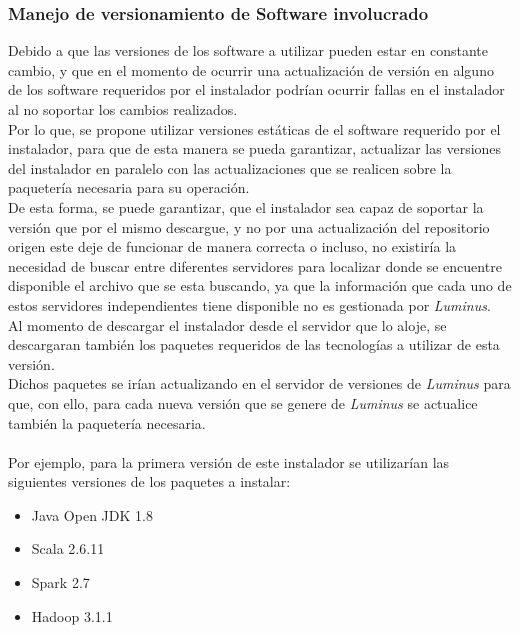 \subsubsection{Manejo de versionamiento de Software involucrado}
Debido a que las versiones de los software a utilizar pueden estar en constante cambio, y que en el momento de ocurrir una actualización de versión en alguno de los software requeridos por el instalador podrían ocurrir fallas en el instalador al no soportar los cambios realizados.
\\
Por lo que, se propone utilizar versiones estáticas de el software requerido por el instalador, para que de esta manera se pueda garantizar, actualizar las versiones del instalador en paralelo con las actualizaciones que se realicen sobre la paquetería necesaria para su operación.
\\
De esta forma, se puede garantizar, que el instalador sea capaz de soportar la versión que por el mismo descargue, y no por una actualización del repositorio origen este deje de funcionar de manera correcta o incluso, no existiría la necesidad de buscar entre diferentes servidores para localizar donde se encuentre disponible el archivo que se esta buscando, ya que la información que cada uno de estos servidores independientes tiene disponible no es gestionada por \emph{Luminus}.
\\
Al momento de descargar el instalador desde el servidor que lo aloje, se descargaran también los paquetes requeridos de las tecnologías a utilizar de esta versión.
\\
Dichos paquetes se irían actualizando en el servidor de versiones de \emph{Luminus} para que, con ello, para cada nueva versión que se genere de \emph{Luminus} se actualice también la paquetería necesaria.
\\
\\
Por ejemplo, para la primera versión de este instalador se utilizarían las siguientes versiones de los paquetes a instalar:
\begin{itemize}
	\item Java Open JDK 1.8
	\item Scala 2.6.11
	\item Spark 2.7
	\item Hadoop 3.1.1
	
\end{itemize}
